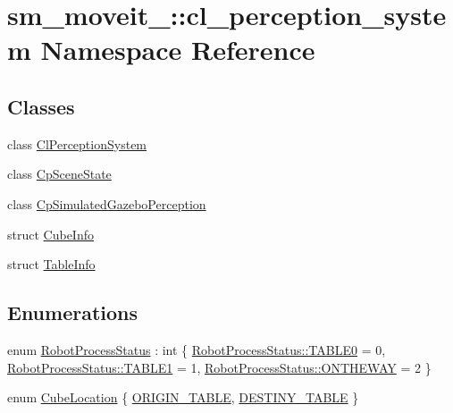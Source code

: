 \hypertarget{namespacesm__moveit__4_1_1cl__perception__system}{}\section{sm\+\_\+moveit\+\_\+:\+:cl\+\_\+perception\+\_\+system Namespace Reference}
\label{namespacesm__moveit__4_1_1cl__perception__system}
\subsection*{Classes}
\begin{DoxyCompactItemize}
\item 
class \hyperlink{classsm__moveit__4_1_1cl__perception__system_1_1ClPerceptionSystem}{Cl\+Perception\+System}
\item 
class \hyperlink{classsm__moveit__4_1_1cl__perception__system_1_1CpSceneState}{Cp\+Scene\+State}
\item 
class \hyperlink{classsm__moveit__4_1_1cl__perception__system_1_1CpSimulatedGazeboPerception}{Cp\+Simulated\+Gazebo\+Perception}
\item 
struct \hyperlink{structsm__moveit__4_1_1cl__perception__system_1_1CubeInfo}{Cube\+Info}
\item 
struct \hyperlink{structsm__moveit__4_1_1cl__perception__system_1_1TableInfo}{Table\+Info}
\end{DoxyCompactItemize}
\subsection*{Enumerations}
\begin{DoxyCompactItemize}
\item 
enum \hyperlink{namespacesm__moveit__4_1_1cl__perception__system_a11dfa58fc66f2d368b894a9f1fec870e}{Robot\+Process\+Status} \+: int \{ \hyperlink{namespacesm__moveit__4_1_1cl__perception__system_a11dfa58fc66f2d368b894a9f1fec870ea1fd65c0ced0ead229bf6dd6a59067a4f}{Robot\+Process\+Status\+::\+T\+A\+B\+L\+E0} = 0, 
\hyperlink{namespacesm__moveit__4_1_1cl__perception__system_a11dfa58fc66f2d368b894a9f1fec870ea5b22e42e5d94a94037a4486a4976c49d}{Robot\+Process\+Status\+::\+T\+A\+B\+L\+E1} = 1, 
\hyperlink{namespacesm__moveit__4_1_1cl__perception__system_a11dfa58fc66f2d368b894a9f1fec870ea92f7ea3097b3fdb1b7a25669cfc1b8bd}{Robot\+Process\+Status\+::\+O\+N\+T\+H\+E\+W\+AY} = 2
 \}
\item 
enum \hyperlink{namespacesm__moveit__4_1_1cl__perception__system_a0d1b8834532a7cf9d19670791eece6d1}{Cube\+Location} \{ \hyperlink{namespacesm__moveit__4_1_1cl__perception__system_a0d1b8834532a7cf9d19670791eece6d1a5ca85581c7ec4e3161b6acf53f8bf0c9}{O\+R\+I\+G\+I\+N\+\_\+\+T\+A\+B\+LE}, 
\hyperlink{namespacesm__moveit__4_1_1cl__perception__system_a0d1b8834532a7cf9d19670791eece6d1abe7910796fc800b37d9dd2514994614c}{D\+E\+S\+T\+I\+N\+Y\+\_\+\+T\+A\+B\+LE}
 \}
\end{DoxyCompactItemize}



